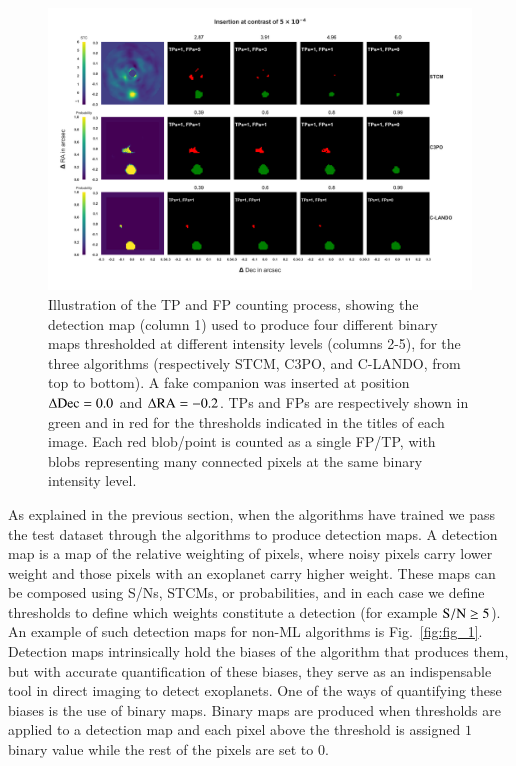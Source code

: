 \documentclass{aa}
\begin{document}
\begin{figure}[t]
    \includegraphics[width=\textwidth]{Fig3_Sep2023.png}
    \caption{Illustration of the TP and FP counting process, showing the detection map (column 1) used to produce four different binary maps thresholded at different intensity levels (columns 2-5), for the three algorithms (respectively STCM, C3PO, and C-LANDO, from top to bottom). A fake companion was inserted at position $\Delta{\rm Dec}=0.0$ and $\Delta{\rm RA} = -0.2$. TPs and FPs are respectively shown in green and in red for the thresholds indicated in the titles of each image. Each red blob/point is counted as a single FP/TP, with blobs representing many connected pixels at the same binary intensity level.}
    \label{fig:sample_detmaps}
\end{figure}

As explained in the previous section, when the algorithms have trained we pass the test dataset through the algorithms to produce detection maps.
A detection map is a map of the relative weighting of pixels, where noisy pixels carry lower weight and those pixels with an exoplanet carry higher weight.
These maps can be composed using S/Ns, STCMs, or probabilities, and in each case we define thresholds to define which weights constitute a detection (for example $\rm{S/N}\ge 5$).
An example of such detection maps for non-ML algorithms is Fig.~\ref{fig:fig_1}.
Detection maps intrinsically hold the biases of the algorithm that produces them, but with accurate quantification of these biases, they serve as an indispensable tool in direct imaging to detect exoplanets.
One of the ways of quantifying these biases is the use of  binary maps.
Binary maps are produced when thresholds are applied to a detection map and each pixel above the threshold is assigned $1$ binary value while the rest of the pixels are set to $0$.
\end{document}
